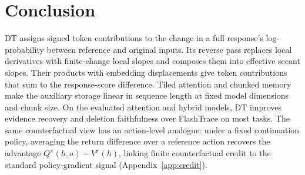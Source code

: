 \section{Conclusion}
DT assigns signed token contributions to the change in a full response's log-probability between reference and original inputs. Its reverse pass replaces local derivatives with finite-change local slopes and composes them into effective secant slopes. Their products with embedding displacements give token contributions that sum to the response-score difference. Tiled attention and chunked memory make the auxiliary storage linear in sequence length at fixed model dimensions and chunk size. On the evaluated attention and hybrid models, DT improves evidence recovery and deletion faithfulness over FlashTrace on most tasks. The same counterfactual view has an action-level analogue: under a fixed continuation policy, averaging the return difference over a reference action recovers the advantage $Q^\pi(h,a)-V^\pi(h)$, linking finite counterfactual credit to the standard policy-gradient signal (Appendix~\ref{app:credit}).
